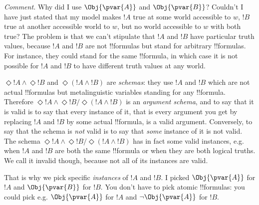 \documentclass[../../../include/open-logic-section]{subfiles}
\begin{document}
\begin{prob}
\begin{ans}
\begin{itemize}
    \end{itemize}

    \emph{Comment.} Why did I use  $\Obj{\pvar{A}}$ and 
    $\Obj{\pvar{B}}$? Couldn't I have just stated that my 
    model makes $!A$ true at some world accessible to $w$, $!B$ true 
    at another accessible world to $w$, but no world accessible to $w$ 
    with both true? The problem is that we can't stipulate that $!A$
    and $!B$ have particular truth values, because $!A$ and $!B$ 
    are not !!{formula}s but stand for arbitrary !!{formula}s. 
    For instance, they could stand for the same !!{formula}, in 
    which case it is not possible for $!A$ and $!B$ to have 
    different truth values at any world.
    
    $\Diamond!A\land\Diamond!B$ and $\Diamond(!A\land!B)$
    are \emph{schemas}: they use $!A$ and $!B$ which are not actual
    !!{formula}s but metalinguistic variables standing for any 
    !!{formula}. Therefore $\Diamond!A\land\Diamond!B / \Diamond(!A\land!B)$
    is an \emph{argument schema}, and to say that it is valid is 
    to say that every instance of it, that is every argument you get
    by replacing $!A$ and $!B$ by some actual !!{formula}, is a valid
    argument. Conversely, to say that the schema is \emph{not}
    valid is to say that \emph{some} instance of it is not valid.
    The schema $\Diamond!A\land\Diamond!B / \Diamond(!A\land!B)$
    has in fact some valid instances, e.g. when $!A$ and $!B$
    are both the same !!{formula} or when they are both logical 
    truths. We call it invalid though, because not all of its 
    instances are valid. 
    
    That is why we pick specific \emph{instances} of $!A$ and $!B$.
    I picked $\Obj{\pvar{A}}$ for $!A$ and $\Obj{\pvar{B}}$ for 
    $!B$. You don't have to pick atomic !!{formula}s: you could 
    pick e.g. $\Obj{\pvar{A}}$ for $!A$ and $\lnot\Obj{\pvar{A}}$
    for $!B$.
        
    \end{ans}
\end{prob}
\end{document}
